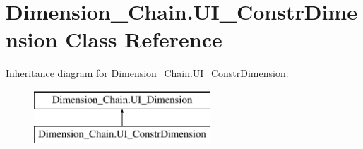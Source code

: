 \hypertarget{class_dimension___chain_1_1_u_i___constr_dimension}{}\section{Dimension\+\_\+\+Chain.\+U\+I\+\_\+\+Constr\+Dimension Class Reference}
\label{class_dimension___chain_1_1_u_i___constr_dimension}
Inheritance diagram for Dimension\+\_\+\+Chain.\+U\+I\+\_\+\+Constr\+Dimension\+:\begin{figure}[H]
\begin{center}
\leavevmode
\includegraphics[height=2.000000cm]{class_dimension___chain_1_1_u_i___constr_dimension}
\end{center}
\end{figure}
